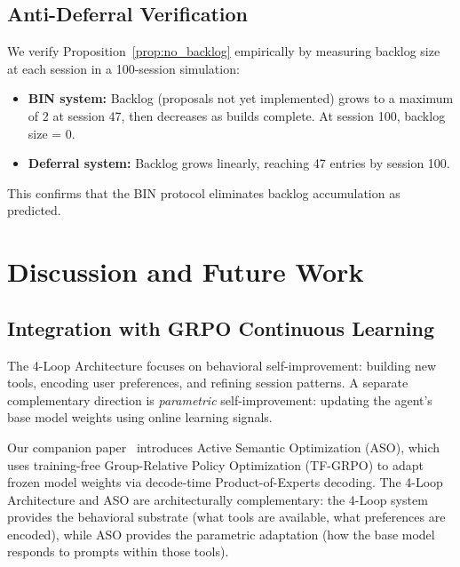 \documentclass[11pt]{article}
\begin{document}
\subsection{Anti-Deferral Verification}

We verify Proposition~\ref{prop:no_backlog} empirically by measuring
backlog size at each session in a 100-session simulation:

\begin{itemize}[leftmargin=1.5em]
    \item \textbf{BIN system:} Backlog (proposals not yet implemented)
          grows to a maximum of 2 at session 47, then decreases as
          builds complete. At session 100, backlog size = 0.
    \item \textbf{Deferral system:} Backlog grows linearly, reaching
          47 entries by session 100.
\end{itemize}

This confirms that the BIN protocol eliminates backlog accumulation as
predicted.

\section{Discussion and Future Work}
\label{sec:discussion}

\subsection{Integration with GRPO Continuous Learning}

The 4-Loop Architecture focuses on behavioral self-improvement: building new
tools, encoding user preferences, and refining session patterns. A separate
complementary direction is \emph{parametric} self-improvement: updating
the agent's base model weights using online learning signals.

Our companion paper~\cite{hanzo2026aso} introduces Active Semantic Optimization
(ASO), which uses training-free Group-Relative Policy Optimization (TF-GRPO)
to adapt frozen model weights via decode-time Product-of-Experts decoding.
The 4-Loop Architecture and ASO are architecturally complementary: the
4-Loop system provides the behavioral substrate (what tools are available,
what preferences are encoded), while ASO provides the parametric adaptation
(how the base model responds to prompts within those tools).
\end{document}
